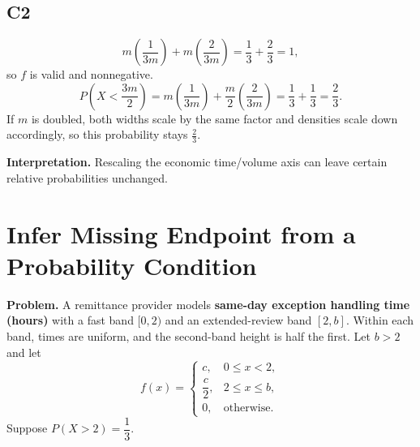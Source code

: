 \subsection*{C2}
\[
m\left(\frac{1}{3m}\right)+m\left(\frac{2}{3m}\right)=\frac{1}{3}+\frac{2}{3}=1,
\]
so $f$ is valid and nonnegative.
\[
P\left(X<\frac{3m}{2}\right)=m\left(\frac{1}{3m}\right)+\frac{m}{2}\left(\frac{2}{3m}\right)=\frac{1}{3}+\frac{1}{3}=\frac{2}{3}.
\]
If $m$ is doubled, both widths scale by the same factor and densities scale down accordingly, so this probability stays $\frac{2}{3}$.
\begin{center}
\end{center}

\textbf{Interpretation.}
Rescaling the economic time/volume axis can leave certain relative probabilities unchanged.

\section{Infer Missing Endpoint from a Probability Condition}

\textbf{Problem.}
A remittance provider models \textbf{same-day exception handling time (hours)} with a fast band $[0,2)$ and an extended-review band $[2,b]$. Within each band, times are uniform, and the second-band height is half the first. Let $b>2$ and let
\[
f(x)=
\begin{cases}
c, & 0\le x<2,\\
\dfrac{c}{2}, & 2\le x\le b,\\
0, & \text{otherwise.}
\end{cases}
\]
Suppose $P(X>2)=\dfrac{1}{3}$.

